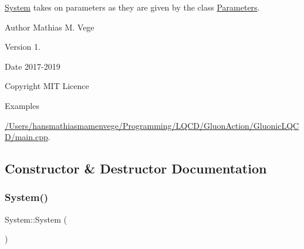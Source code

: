 \mbox{\hyperlink{class_system}{System}} takes on parameters as they are given by the class \mbox{\hyperlink{class_parameters}{Parameters}}.

\begin{DoxyAuthor}{Author}
Mathias M. Vege 
\end{DoxyAuthor}
\begin{DoxyVersion}{Version}
1. 
\end{DoxyVersion}
\begin{DoxyDate}{Date}
2017-\/2019 
\end{DoxyDate}
\begin{DoxyCopyright}{Copyright}
M\+IT Licence 
\end{DoxyCopyright}
\begin{Desc}
\item[Examples]\par
\mbox{\hyperlink{_2_users_2hansmathiasmamenvege_2_programming_2_l_q_c_d_2_gluon_action_2_gluonic_l_q_c_d_2main_8cpp-example}{/\+Users/hansmathiasmamenvege/\+Programming/\+L\+Q\+C\+D/\+Gluon\+Action/\+Gluonic\+L\+Q\+C\+D/main.\+cpp}}.\end{Desc}


\subsection{Constructor \& Destructor Documentation}
\mbox{\label{class_system_ae317936c9bcf1374d61745572e0f2f8a}} 
\subsubsection{\texorpdfstring{System()}{System()}}
{\footnotesize\ttfamily System\+::\+System (\begin{DoxyParamCaption}{ }\end{DoxyParamCaption})}

